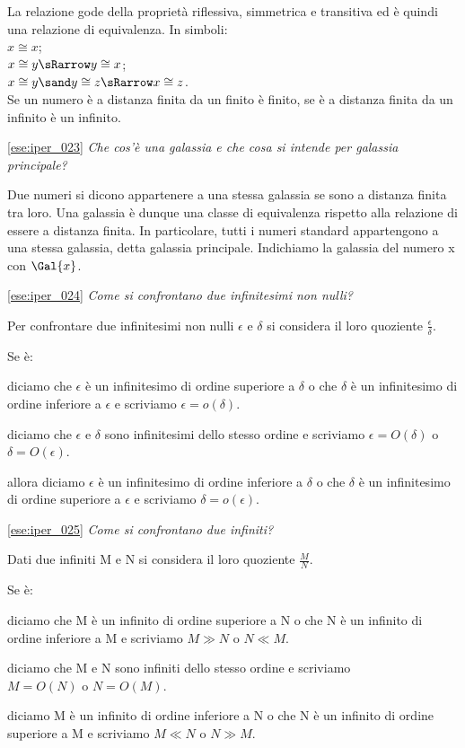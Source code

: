 La relazione gode della proprietà riflessiva, simmetrica e transitiva ed è 
quindi una relazione di equivalenza. In simboli:\\
\(x \cong x\);\\
\(x \cong y \sRarrow y \cong x\);\\
\(x \cong y \sand y \cong z \sRarrow x \cong z\).\\
Se un numero è a distanza finita da un finito è finito, se è a distanza finita 
da un infinito è un infinito.

\ref{ese:iper_023} 
\emph{Che cos'è una galassia e che cosa si intende per galassia principale?}

Due numeri si dicono appartenere a una stessa galassia se sono a distanza 
finita tra loro. Una galassia è dunque una classe di equivalenza rispetto alla 
relazione di essere a distanza finita. In particolare, tutti i numeri standard 
appartengono a una stessa galassia, detta galassia principale. Indichiamo la 
galassia del numero x con \(\Gal{x}\).

\ref{ese:iper_024} 
\emph{Come si confrontano due infinitesimi non nulli?}

Per confrontare due infinitesimi non nulli \(\epsilon\) e \(\delta\) si 
considera il loro quoziente \(\frac{\epsilon}{\delta}\). 

Se è:
\begin{description} [nosep]
 \item [infinitesimo] 
diciamo che \(\epsilon\) è un infinitesimo di ordine superiore a \(\delta\) o 
che \(\delta\) è un infinitesimo di ordine inferiore a 
\(\epsilon\) e 
scriviamo \(\epsilon = o(\delta)\).
 \item [finito non infinitesimo] 
diciamo che \(\epsilon\) e \(\delta\) sono infinitesimi dello stesso ordine e 
scriviamo \(\epsilon = O(\delta)\) o \(\delta = O(\epsilon)\).
 \item [infinito]
 allora diciamo \(\epsilon\) è un infinitesimo di ordine inferiore a \(\delta\) 
o che \(\delta\) è un infinitesimo di ordine superiore a \(\epsilon\) e 
scriviamo \(\delta = o(\epsilon)\).
\end{description}

\ref{ese:iper_025} 
\emph{Come si confrontano due infiniti?}

Dati due infiniti M e N si considera il loro quoziente \(\frac{M}{N}\). 

Se è:
\begin{description} [nosep]
 \item [infinito] 
diciamo che M è un infinito di ordine superiore a N o che N è un infinito di 
ordine inferiore a M e scriviamo \(M \gg N\) o \(N \ll M\).
 \item [finito non infinitesimo] 
diciamo che M e N sono infiniti dello stesso ordine e scriviamo \\
\(M = O(N)\) o \(N = O(M)\).
 \item [infinitesimo]
diciamo M è un infinito di ordine inferiore a N o che N è un 
infinito di ordine superiore a M e scriviamo \(M \ll N\) o \(N \gg M\).
\end{description}

